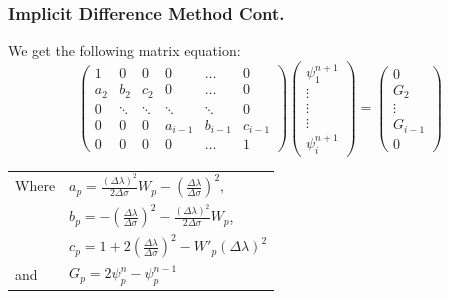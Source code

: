 \documentclass[xcolor=dvipsnames]{beamer}
\begin{document}
\begin{frame}
\frametitle{Implicit Difference Method Cont.}
We get the following matrix equation:
\[
\begin{pmatrix}
  1&0&0&0&\ldots&0 \\
  a_2&b_2&c_2&0&\ldots&0\\
  0&\ddots&\ddots&\ddots&\ddots&0\\
  0&0&0&a_{i-1}&b_{i-1}&c_{i-1}\\
	0&0&0&0&\ldots&1
\end{pmatrix}
\begin{pmatrix}
\psi_1^{n+1}\\
\vdots\\
\vdots\\
\vdots\\
\psi_i^{n+1}
\end{pmatrix}=
\begin{pmatrix}
0\\
G_2\\
\vdots\\
G_{i-1}\\
0
\end{pmatrix}
\]

\begin{tabular}{ll}\vspace{2mm}
Where &$a_p=\frac{(\Delta\lambda)^2}{2\Delta\sigma} W_p-(\frac{\Delta\lambda}{\Delta\sigma})^2$,\\ \vspace{2mm} &$b_p=-(\frac{\Delta\lambda}{\Delta\sigma})^2-\frac{(\Delta\lambda)^2}{2\Delta\sigma}W_p$,\\ \vspace{2mm} &$c_p=1+2(\frac{\Delta\lambda}{\Delta\sigma})^2-W'_p(\Delta\lambda)^2$ \\
and &$G_p=2\psi^n_p-\psi^{n-1}_p$
\end{tabular}
\end{frame}
\end{document}
